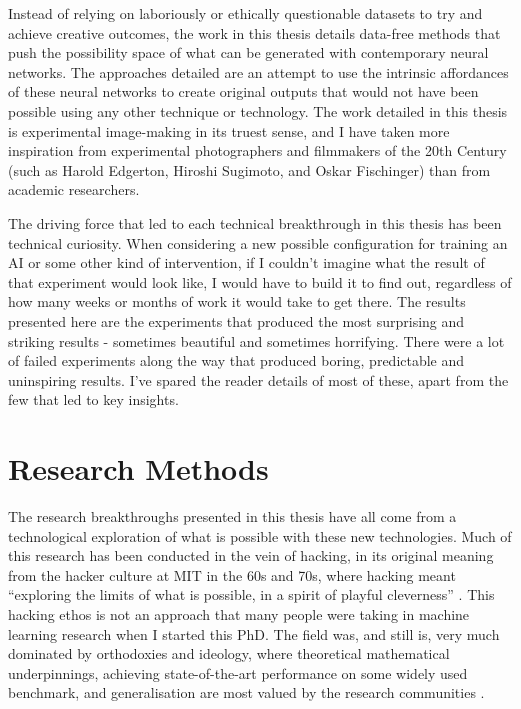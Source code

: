 Instead of relying on laboriously or ethically questionable datasets to try and achieve creative outcomes, the work in this thesis details data-free methods that push the possibility space of what can be generated with contemporary neural networks.
The approaches detailed are an attempt to use the intrinsic affordances of these neural networks to create original outputs that would not have been possible using any other technique or technology. 
The work detailed in this thesis is experimental image-making in its truest sense, and I have taken more inspiration from experimental photographers and filmmakers of the 20th Century (such as Harold Edgerton, Hiroshi Sugimoto, and Oskar Fischinger) than from academic researchers.

The driving force that led to each technical breakthrough in this thesis has been technical curiosity. 
When considering a new possible configuration for training an AI or some other kind of intervention, if I couldn’t imagine what the result of that experiment would look like, I would have to build it to find out, regardless of how many weeks or months of work it would take to get there. 
The results presented here are the experiments that produced the most surprising and striking results - sometimes beautiful and sometimes horrifying. 
There were a lot of failed experiments along the way that produced boring, predictable and uninspiring results. 
I’ve spared the reader details of most of these, apart from the few that led to key insights.

\section{Research Methods}

The research breakthroughs presented in this thesis have all come from a technological exploration of what is possible with these new technologies. Much of this research has been conducted in the vein of hacking, in its original meaning from the hacker culture at MIT in the 60s and 70s, where hacking meant “exploring the limits of what is possible, in a spirit of playful cleverness” \citep{stallman2002hacking}. 
This hacking ethos is not an approach that many people were taking in machine learning research when I started this PhD. 
The field was, and still is, very much dominated by orthodoxies and ideology, where theoretical mathematical underpinnings, achieving state-of-the-art performance on some widely used benchmark, and generalisation are most valued by the research communities \citep{birhane2022values}.

